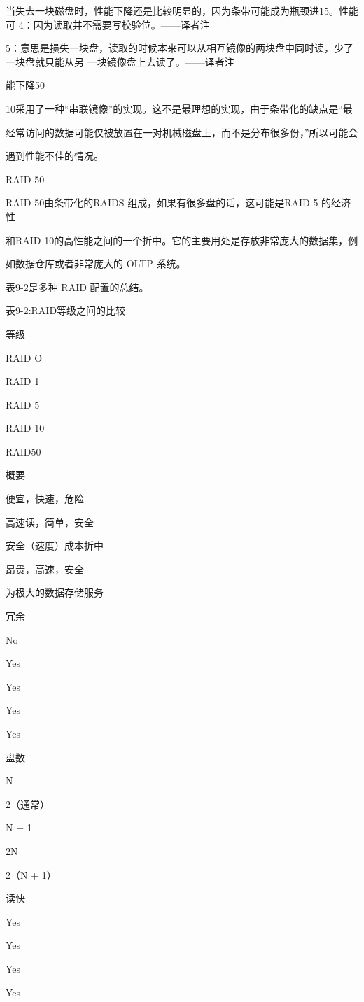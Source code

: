当失去一块磁盘时，性能下降还是比较明显的，因为条带可能成为瓶颈进15。性能可
4：因为读取并不需要写校验位。——译者注

5：意思是损失一块盘，读取的时候本来可以从相互镜像的两块盘中同时读，少了一块盘就只能从另
一块镜像盘上去读了。——译者注

能下降50%

10采用了一种“串联镜像”的实现。这不是最理想的实现，由于条带化的缺点是“最

经常访问的数据可能仅被放置在一对机械磁盘上，而不是分布很多份，”所以可能会

遇到性能不佳的情况。

RAID 50

RAID 50由条带化的RAIDS 组成，如果有很多盘的话，这可能是RAID 5 的经济性

和RAID 10的高性能之间的一个折中。它的主要用处是存放非常庞大的数据集，例

如数据仓库或者非常庞大的 OLTP 系统。

表9-2是多种 RAID 配置的总结。

表9-2:RAID等级之间的比较

等级

RAID O

RAID 1

RAID 5

RAID 10

RAID50

概要

便宜，快速，危险

高速读，简单，安全

安全（速度）成本折中

昂贵，高速，安全

为极大的数据存储服务

冗余

No

Yes

Yes

Yes

Yes

盘数

N

2（通常）

N + 1

2N

2（N + 1）

读快

Yes

Yes

Yes

Yes

